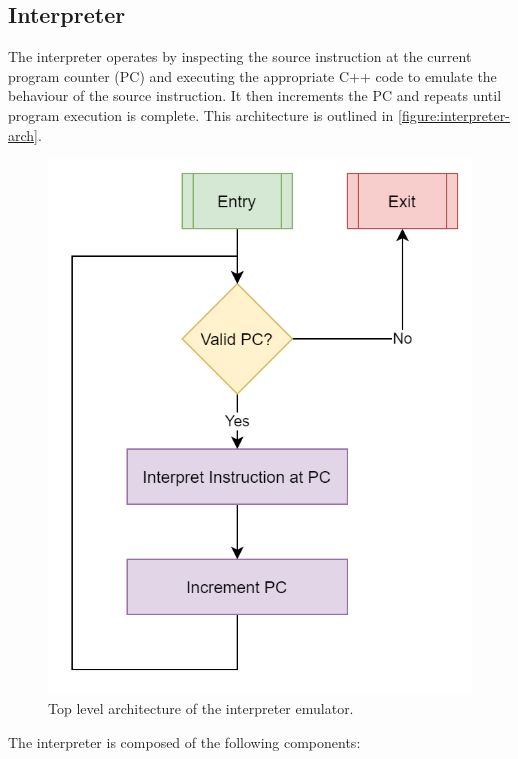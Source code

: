 \subsection{Interpreter}
\label{section:interpreter-reg-file}
\label{section:interpreter-mem-map}

The interpreter operates by inspecting the source instruction at the current program counter (PC) and executing the appropriate C++ code to emulate the behaviour of the source instruction. It then increments the PC and repeats until program execution is complete. This architecture is outlined in \autoref{figure:interpreter-arch}.

\begin{figure}[h]
    \centering
    \includegraphics[width=0.5\linewidth]{diagrams/interpreter.png}
    \caption{Top level architecture of the interpreter emulator.}
    \label{figure:interpreter-arch}
\end{figure}

The interpreter is composed of the following components:

